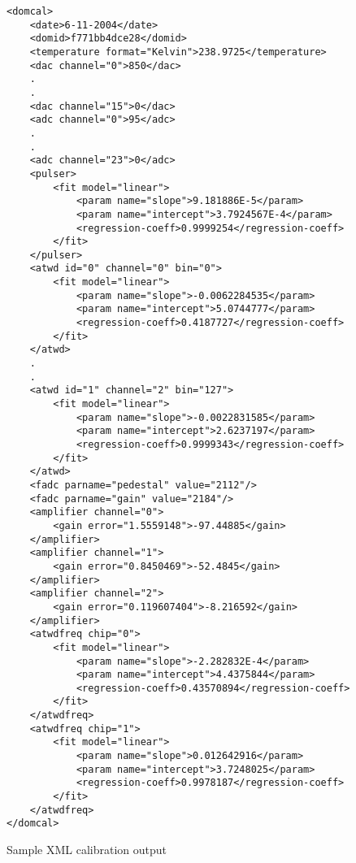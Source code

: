 \documentclass[10pt]{article}
\begin{document}
\begin{figure}
\begin{footnotesize}
\begin{verbatim}
<domcal>
    <date>6-11-2004</date>
    <domid>f771bb4dce28</domid>
    <temperature format="Kelvin">238.9725</temperature>
    <dac channel="0">850</dac>
    .
    .
    <dac channel="15">0</dac>
    <adc channel="0">95</adc>
    .
    .
    <adc channel="23">0</adc>
    <pulser>
        <fit model="linear">
            <param name="slope">9.181886E-5</param>
            <param name="intercept">3.7924567E-4</param>
            <regression-coeff>0.9999254</regression-coeff>
        </fit>
    </pulser>
    <atwd id="0" channel="0" bin="0">
        <fit model="linear">
            <param name="slope">-0.0062284535</param>
            <param name="intercept">5.0744777</param>
            <regression-coeff>0.4187727</regression-coeff>
        </fit>
    </atwd>
    .
    .
    <atwd id="1" channel="2" bin="127">
        <fit model="linear">
            <param name="slope">-0.0022831585</param>
            <param name="intercept">2.6237197</param>
            <regression-coeff>0.9999343</regression-coeff>
        </fit>
    </atwd>
    <fadc parname="pedestal" value="2112"/>
    <fadc parname="gain" value="2184"/>
    <amplifier channel="0">
        <gain error="1.5559148">-97.44885</gain>
    </amplifier>
    <amplifier channel="1">
        <gain error="0.8450469">-52.4845</gain>
    </amplifier>
    <amplifier channel="2">
        <gain error="0.119607404">-8.216592</gain>
    </amplifier>
    <atwdfreq chip="0">
        <fit model="linear">
            <param name="slope">-2.282832E-4</param>
            <param name="intercept">4.4375844</param>
            <regression-coeff>0.43570894</regression-coeff>
        </fit>
    </atwdfreq>
    <atwdfreq chip="1">
        <fit model="linear">
            <param name="slope">0.012642916</param>
            <param name="intercept">3.7248025</param>
            <regression-coeff>0.9978187</regression-coeff>
        </fit>
    </atwdfreq>
</domcal>
\end{verbatim}
\end{footnotesize}
\caption{Sample XML calibration output}
\label{fig:xml}
\end{figure}
\end{document}
